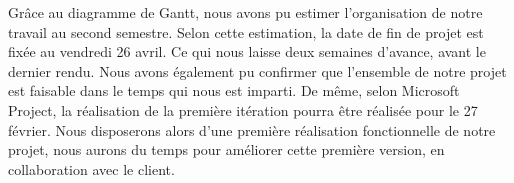 Grâce au diagramme de Gantt, nous avons pu estimer l’organisation de notre travail au second semestre. Selon cette estimation, la date de fin de projet est fixée au vendredi 26 avril. Ce qui nous laisse deux semaines d’avance, avant le dernier rendu. Nous avons également pu confirmer que l’ensemble de notre projet est faisable dans le temps qui nous est imparti. De même, selon Microsoft Project, la réalisation de la première itération pourra être réalisée pour le 27 février. Nous disposerons alors d’une première réalisation fonctionnelle de notre projet, nous aurons du temps pour améliorer cette première version, en collaboration avec le client.














